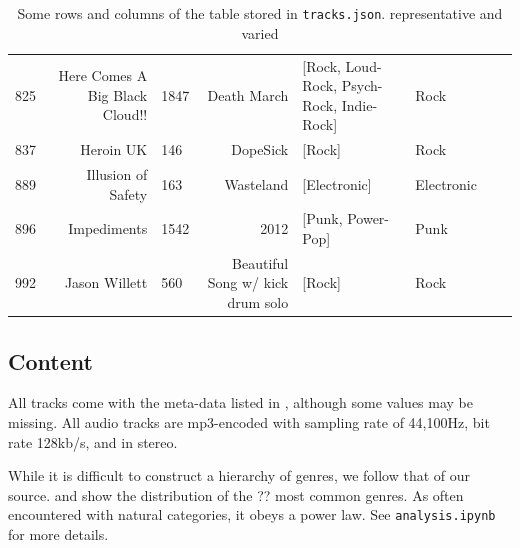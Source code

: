 \documentclass{article}
\newcommand{\todo}[1]{{\color{red} #1 }}
\begin{document}
\begin{table}
\begin{tabular}{lrlrllll}
		 825 &                     Here Comes A Big Black Cloud!! &        1847 &                                        Death March &          [Rock, Loud-Rock, Psych-Rock, Indie-Rock] &                 Rock  \\
		837 &                                          Heroin UK &         146 &                                           DopeSick &                                             [Rock] &                 Rock \\
		 889 &                                 Illusion of Safety &         163 &                                          Wasteland &                                       [Electronic] &           Electronic  \\
		 896 &                                        Impediments &        1542 &                                               2012 &                                  [Punk, Power-Pop] &                 Punk  \\
			  992 &                                      Jason Willett &         560 &                   Beautiful Song w/ kick drum solo &                                             [Rock] &                 Rock  \\
	\bottomrule
	\end{tabular}
	\caption{Some rows and columns of the table stored in \texttt{tracks.json}. \todo{representative and varied}}
	\label{tab:tracks}
\end{table}

\subsection{Content} \label{sec:content}

All tracks come with the meta-data listed in , although some values may be missing.
All audio tracks are mp3-encoded with sampling rate of 44,100Hz, bit rate 128kb/s, and in stereo. 


While it is difficult to construct a hierarchy of genres, we follow that of our source.  and  show the distribution of the \todo{??} most common genres. As often encountered with natural categories, it obeys a power law.
See \texttt{analysis.ipynb} for more details.
\end{document}
